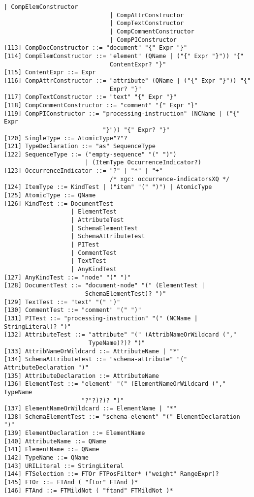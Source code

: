 \begin{Verbatim}[frame=none, fontsize=\footnotesize]
                              | CompElemConstructor
                              | CompAttrConstructor
                              | CompTextConstructor
                              | CompCommentConstructor
                              | CompPIConstructor
[113] CompDocConstructor ::= "document" "{" Expr "}"
[114] CompElemConstructor ::= "element" (QName | ("{" Expr "}")) "{"
                              ContentExpr? "}" 
[115] ContentExpr ::= Expr
[116] CompAttrConstructor ::= "attribute" (QName | ("{" Expr "}")) "{"
                              Expr? "}"  
[117] CompTextConstructor ::= "text" "{" Expr "}"
[118] CompCommentConstructor ::= "comment" "{" Expr "}"
[119] CompPIConstructor ::= "processing-instruction" (NCName | ("{" Expr
                            "}")) "{" Expr? "}" 
[120] SingleType ::= AtomicType"?"? 
[121] TypeDeclaration ::= "as" SequenceType
[122] SequenceType ::= ("empty-sequence" "(" ")")
                       | (ItemType OccurrenceIndicator?)
[123] OccurrenceIndicator ::= "?" | "*" | "+"	
                              /* xgc: occurrence-indicatorsXQ */
[124] ItemType ::= KindTest | ("item" "(" ")") | AtomicType
[125] AtomicType ::= QName
[126] KindTest ::= DocumentTest
                   | ElementTest
                   | AttributeTest
                   | SchemaElementTest
                   | SchemaAttributeTest
                   | PITest
                   | CommentTest
                   | TextTest
                   | AnyKindTest
[127] AnyKindTest ::= "node" "(" ")"
[128] DocumentTest ::= "document-node" "(" (ElementTest |
                       SchemaElementTest)? ")" 
[129] TextTest ::= "text" "(" ")"
[130] CommentTest ::= "comment" "(" ")"
[131] PITest ::= "processing-instruction" "(" (NCName | StringLiteral)? ")"
[132] AttributeTest ::= "attribute" "(" (AttribNameOrWildcard (","
                        TypeName)?)? ")"
[133] AttribNameOrWildcard ::= AttributeName | "*"
[134] SchemaAttributeTest ::= "schema-attribute" "(" AttributeDeclaration ")" 
[135] AttributeDeclaration ::= AttributeName
[136] ElementTest ::= "element" "(" (ElementNameOrWildcard ("," TypeName
                      "?"?)?)? ")" 
[137] ElementNameOrWildcard ::= ElementName | "*"
[138] SchemaElementTest ::= "schema-element" "(" ElementDeclaration ")"
[139] ElementDeclaration ::= ElementName
[140] AttributeName ::= QName
[141] ElementName ::= QName
[142] TypeName ::= QName
[143] URILiteral ::= StringLiteral
[144] FTSelection ::= FTOr FTPosFilter* ("weight" RangeExpr)?
[145] FTOr ::= FTAnd ( "ftor" FTAnd )*
[146] FTAnd ::= FTMildNot ( "ftand" FTMildNot )*

\end{Verbatim}
